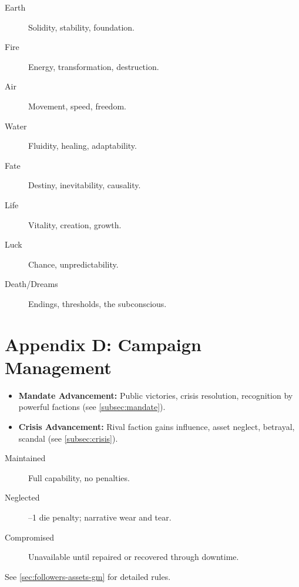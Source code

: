 \begin{tcolorbox}[title=Eight Elements of Magic, colback=white!97!gray, colframe=black!80!gray,breakable]
\begin{description}
  \item[Earth] Solidity, stability, foundation.
  \item[Fire] Energy, transformation, destruction.
  \item[Air] Movement, speed, freedom.
  \item[Water] Fluidity, healing, adaptability.
  \item[Fate] Destiny, inevitability, causality.
  \item[Life] Vitality, creation, growth.
  \item[Luck] Chance, unpredictability.
  \item[Death/Dreams] Endings, thresholds, the subconscious.
\end{description}
\end{tcolorbox}

\clearpage
\section*{Appendix D: Campaign Management}
\label{app:campaign}

\begin{tcolorbox}[title=Campaign Timer Examples, colback=white!97!gray, colframe=black!80!gray,breakable]
\begin{itemize}
  \item \textbf{Mandate Advancement:} Public victories, crisis resolution, recognition by powerful factions (see \ref{subsec:mandate}).
  \item \textbf{Crisis Advancement:} Rival faction gains influence, asset neglect, betrayal, scandal (see \ref{subsec:crisis}).
\end{itemize}
\end{tcolorbox}

\begin{tcolorbox}[title=Follower and Asset Condition States, colback=white!97!gray, colframe=black!80!gray,breakable]
\begin{description}
  \item[Maintained] Full capability, no penalties.
  \item[Neglected] --1 die penalty; narrative wear and tear.
  \item[Compromised] Unavailable until repaired or recovered through downtime.
\end{description}
See \ref{sec:followers-assets-gm} for detailed rules.
\end{tcolorbox}

